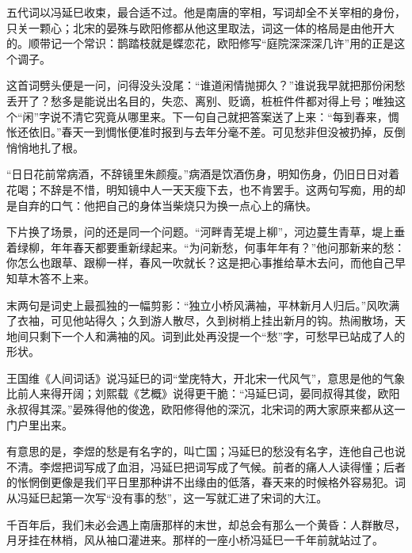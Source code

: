 \begin{appreciation}
五代词以冯延巳收束，最合适不过。他是南唐的宰相，写词却全不关宰相的身份，只关一颗心；北宋的晏殊与欧阳修都从他这里取法，词这一体的格局是由他开大的。顺带记一个常识：鹊踏枝就是蝶恋花，欧阳修写“庭院深深深几许”用的正是这个调子。

这首词劈头便是一问，问得没头没尾：“谁道闲情抛掷久？”谁说我早就把那份闲愁丢开了？愁多是能说出名目的，失恋、离别、贬谪，桩桩件件都对得上号；唯独这个“闲”字说不清它究竟从哪里来。下一句自己就把答案送了上来：“每到春来，惆怅还依旧。”春天一到惆怅便准时报到与去年分毫不差。可见愁非但没被扔掉，反倒悄悄地扎了根。

“日日花前常病酒，不辞镜里朱颜瘦。”病酒是饮酒伤身，明知伤身，仍旧日日对着花喝；不辞是不惜，明知镜中人一天天瘦下去，也不肯罢手。这两句写痴，用的却是自弃的口气：他把自己的身体当柴烧只为换一点心上的痛快。

下片换了场景，问的还是同一个问题。“河畔青芜堤上柳”，河边蔓生青草，堤上垂着绿柳，年年春天都要重新绿起来。“为问新愁，何事年年有？”他问那新来的愁：你怎么也跟草、跟柳一样，春风一吹就长？这是把心事推给草木去问，而他自己早知草木答不上来。

末两句是词史上最孤独的一幅剪影：“独立小桥风满袖，平林新月人归后。”风吹满了衣袖，可见他站得久；久到游人散尽，久到树梢上挂出新月的钩。热闹散场，天地间只剩下一个人和满袖的风。词到此处再没提一个“愁”字，可愁早已站成了人的形状。

王国维《人间词话》说冯延巳的词“堂庑特大，开北宋一代风气”，意思是他的气象比前人来得开阔；刘熙载《艺概》说得更干脆：“冯延巳词，晏同叔得其俊，欧阳永叔得其深。”晏殊得他的俊逸，欧阳修得他的深沉，北宋词的两大家原来都从这一门户里出来。

有意思的是，李煜的愁是有名字的，叫亡国；冯延巳的愁没有名字，连他自己也说不清。李煜把词写成了血泪，冯延巳把词写成了气候。前者的痛人人读得懂；后者的怅惘倒更像是我们平日里那种讲不出缘由的低落，春天来的时候格外容易犯。词从冯延巳起第一次写“没有事的愁”，这一写就汇进了宋词的大江。

千百年后，我们未必会遇上南唐那样的末世，却总会有那么一个黄昏：人群散尽，月牙挂在林梢，风从袖口灌进来。那样的一座小桥冯延巳一千年前就站过了。
\end{appreciation}
